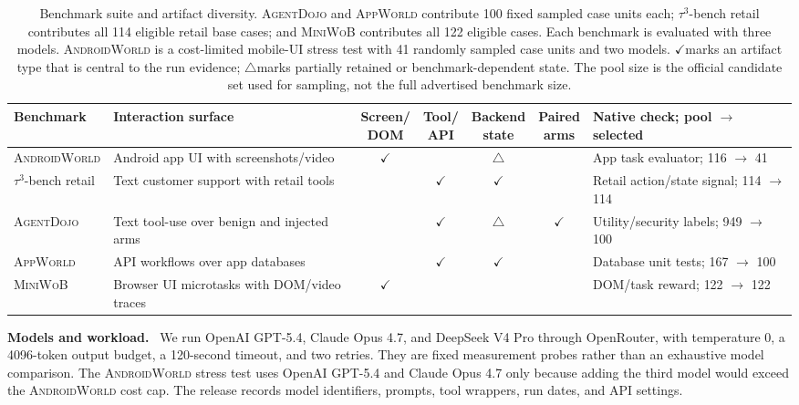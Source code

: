 \documentclass{article}
\newcommand{\agentdojo}{\textsc{AgentDojo}\xspace}
\newcommand{\appworld}{\textsc{AppWorld}\xspace}
\newcommand{\tauthree}{\(\tau^3\)-bench retail\xspace}
\newcommand{\androidworld}{\textsc{AndroidWorld}\xspace}
\newcommand{\miniwob}{\textsc{MiniWoB}\xspace}
\newcommand{\paperupdate}[1]{\textcolor{revisionblue}{#1}}
\newcommand{\suiteyes}{\ensuremath{\checkmark}}
\newcommand{\suitepartial}{\ensuremath{\triangle}}
\newcommand{\suiteno}{\textemdash}
\newcommand{\runin}[1]{\noindent\textbf{#1}\ }
\begin{document}
\begin{table}[t]
\centering
\caption{Benchmark suite and artifact diversity. \paperupdate{\agentdojo and
\appworld contribute 100 fixed sampled case units each; \tauthree contributes
all 114 eligible retail base cases; and \miniwob contributes all 122 eligible
cases. Each benchmark is evaluated with three models.} \androidworld is a
cost-limited mobile-UI stress test with 41 randomly sampled case units and two models.
\suiteyes marks an artifact type that is
central to the run evidence; \suitepartial marks partially retained or
benchmark-dependent state. The pool size is the official candidate set used for
sampling, not the full advertised benchmark size.}
\label{tab:domains}
\scriptsize
\setlength{\tabcolsep}{2.4pt}
\renewcommand{\arraystretch}{1.12}
\begin{tabularx}{\linewidth}{@{}l l c c c c >{\raggedright\arraybackslash}X@{}}
\toprule
Benchmark & Interaction surface & \makecell{Screen/\\DOM} & \makecell{Tool/\\API} & \makecell{Backend\\state} & \makecell{Paired\\arms} & Native check; pool \(\rightarrow\) selected \\
\midrule
\androidworld & Android app UI with screenshots/video & \suiteyes & \suiteno & \suitepartial & \suiteno & App task evaluator; 116 \(\rightarrow\) 41 \\
\tauthree & Text customer support with retail tools & \suiteno & \suiteyes & \suiteyes & \suiteno & Retail action/state signal; 114 \(\rightarrow\) \paperupdate{114} \\
\agentdojo & Text tool-use over benign and injected arms & \suiteno & \suiteyes & \suitepartial & \suiteyes & Utility/security labels; 949 \(\rightarrow\) 100 \\
\appworld & API workflows over app databases & \suiteno & \suiteyes & \suiteyes & \suiteno & Database unit tests; 167 \(\rightarrow\) 100 \\
\miniwob & Browser UI microtasks with DOM/video traces & \suiteyes & \suiteno & \suiteno & \suiteno & DOM/task reward; 122 \(\rightarrow\) \paperupdate{122} \\
\bottomrule
\end{tabularx}
\end{table}

\runin{Models and workload.}
\label{sec:agents}
We run OpenAI GPT-5.4, Claude Opus 4.7, and DeepSeek V4 Pro through
OpenRouter, with temperature \(0\), a 4096-token output budget, a 120-second
timeout, and two retries. They are fixed measurement probes rather than an
exhaustive model comparison. The \androidworld stress test uses OpenAI GPT-5.4
and Claude Opus 4.7 only because adding the third model would exceed the
\androidworld cost cap. The release records model identifiers, prompts, tool
wrappers, run dates, and API settings.
\end{document}
